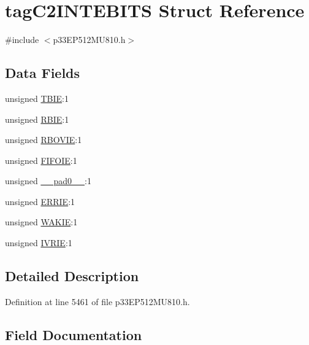 \hypertarget{structtag_c2_i_n_t_e_b_i_t_s}{}\section{tag\+C2\+I\+N\+T\+E\+B\+I\+TS Struct Reference}
\label{structtag_c2_i_n_t_e_b_i_t_s}


{\ttfamily \#include $<$p33\+E\+P512\+M\+U810.\+h$>$}

\subsection*{Data Fields}
\begin{DoxyCompactItemize}
\item 
unsigned \hyperlink{structtag_c2_i_n_t_e_b_i_t_s_ade1d976453f8686ffc298d08007a2ba2}{T\+B\+IE}\+:1
\item 
unsigned \hyperlink{structtag_c2_i_n_t_e_b_i_t_s_ab20cb587b32c351a91e1b912ce3e29f4}{R\+B\+IE}\+:1
\item 
unsigned \hyperlink{structtag_c2_i_n_t_e_b_i_t_s_a7493513f5f1f051c784baf845722edb2}{R\+B\+O\+V\+IE}\+:1
\item 
unsigned \hyperlink{structtag_c2_i_n_t_e_b_i_t_s_ad78757d4f1cf43e7b7933b2f6d67ea87}{F\+I\+F\+O\+IE}\+:1
\item 
unsigned \hyperlink{structtag_c2_i_n_t_e_b_i_t_s_adf71f3d8410c1f1dbbc96680a92c49af}{\+\_\+\+\_\+pad0\+\_\+\+\_\+}\+:1
\item 
unsigned \hyperlink{structtag_c2_i_n_t_e_b_i_t_s_a099df50d2f2eea6c52f09d4b03693718}{E\+R\+R\+IE}\+:1
\item 
unsigned \hyperlink{structtag_c2_i_n_t_e_b_i_t_s_ad138d5d20a12a9f2753fea9b04492987}{W\+A\+K\+IE}\+:1
\item 
unsigned \hyperlink{structtag_c2_i_n_t_e_b_i_t_s_a568db6cec64f1f25a3e931c1a27a750e}{I\+V\+R\+IE}\+:1
\end{DoxyCompactItemize}


\subsection{Detailed Description}


Definition at line 5461 of file p33\+E\+P512\+M\+U810.\+h.



\subsection{Field Documentation}
\mbox{\label{structtag_c2_i_n_t_e_b_i_t_s_adf71f3d8410c1f1dbbc96680a92c49af}} 
